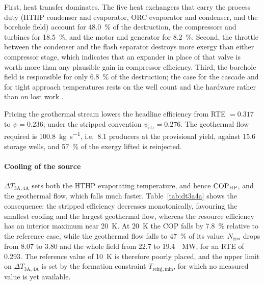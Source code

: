 First, heat transfer dominates. The five heat exchangers that carry the
process duty (HTHP condenser and evaporator, ORC evaporator and condenser, and
the borehole field) account for \SI{48.0}{\percent} of the destruction, the
compressors and turbines for \SI{18.5}{\percent}, and the motor and generator
for \SI{8.2}{\percent}. Second, the throttle between the condenser and the flash
separator destroys more exergy than either compressor stage, which indicates
that an expander in place of that valve is worth more than any plausible gain
in compressor efficiency. Third, the borehole field is responsible for only
\SI{6.8}{\percent} of the destruction; the case for the cascade and for tight
approach temperatures rests on the well count and the hardware rather than on
lost work .

Pricing the geothermal stream lowers the headline efficiency from RTE $=0.317$
to $\psi=0.236$; under the stripped convention $\psi_\mathrm{str}=0.276$. The
geothermal flow required is \SI{100.8}{\kilo\gram\per\second}, i.e.\ 8.1
producers at the provisional yield, against 15.6 storage wells, and
\SI{57}{\percent} of the exergy lifted is reinjected.

\paragraph{Cooling of the source} $\Delta T_\mathrm{3A,4A}$ sets both the HTHP
evaporating temperature, and hence $\mathrm{COP}_{\mathrm{HP}}$, and the geothermal flow, which falls
much faster. Table~\ref{tab:dt3a4a} shows the consequence: the stripped
efficiency decreases monotonically, favouring the smallest cooling and the
largest geothermal flow, whereas the resource efficiency has an interior
maximum near \SI{20}{\kelvin}. At \SI{20}{\kelvin} the COP falls by
\SI{7.8}{\percent} relative to the reference case, while the geothermal flow
falls to \SI{47}{\percent} of its value: $N_\mathrm{geo}$ drops from
\num{8.07} to \num{3.80} and the whole field from \num{22.7} to
\SI{19.4}{\per\mega\watt}, for an RTE of \num{0.293}. The reference
value of \SI{10}{\kelvin} is therefore poorly placed, and the upper limit on
$\Delta T_\mathrm{3A,4A}$ is set by the formation constraint
$T_\mathrm{reinj,min}$, for which no measured value is yet available.

